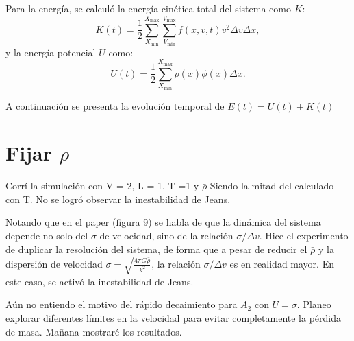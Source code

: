 \documentclass[notitlepage,letterpaper,12pt]{article} %
\begin{document}
Para la energía, se calculó la energía cinética total del sistema como $K$:
\begin{equation}
K(t) = \frac{1}{2} \sum_{X_\text{min}}^{X_\text{max}} \sum_{V_\text{min}}^{V_\text{max}} f(x,v,t) v^2 \Delta v \Delta x,
\end{equation}
y la energía potencial $U$ como:
\begin{equation}
U(t) = \frac{1}{2} \sum_{X_\text{min}}^{X_\text{max}} \rho(x) \phi(x) \Delta x.
\end{equation}

A continuación se presenta la evolución temporal de $E(t) = U(t) + K(t)$


\section{Fijar $\bar{\rho}$}
Corrí la simulación con V = 2, L = 1, T =1 y $\bar{\rho}$ Siendo la mitad del calculado con T. 
No se logró observar la inestabilidad de Jeans.

Notando que en el paper \citet{2013ApJ...762..116Y} (figura 9) se habla de que la dinámica del sistema depende no solo del $\sigma$ de velocidad, sino de la relación $\sigma / \Delta v$.
Hice el experimento de duplicar la resolución del sistema, de forma que a pesar de reducir el $\bar{\rho}$ y la dispersión de velocidad $\sigma = \sqrt{\frac{4 \pi G \bar{\rho}}{k^2}}$, la relación $\sigma / \Delta v$ es en realidad mayor.
En este caso, se activó la inestabilidad de Jeans.









Aún no entiendo el motivo del rápido decaimiento para $A_2$ con $U=\sigma$.
Planeo explorar diferentes límites en la velocidad para evitar completamente la pérdida de masa. Mañana mostraré los resultados.
\end{document}
